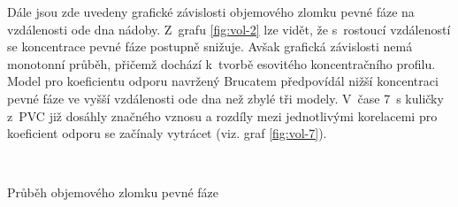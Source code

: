 Dále jsou zde uvedeny grafické závislosti objemového zlomku pevné fáze na vzdálenosti ode dna nádoby. Z~grafu \ref{fig:vol-2} lze vidět, že s~rostoucí vzdáleností se koncentrace pevné fáze postupně snižuje. Avšak grafická závislosti nemá monotonní průběh, přičemž dochází k~tvorbě esovitého koncentračního profilu. Model pro koeficientu odporu navržený Brucatem předpovídál nižší koncentraci pevné fáze ve vyšší vzdálenosti ode dna než zbylé tři modely. V~čase \SI{7}{\second} kuličky z~PVC již dosáhly značného vznosu a rozdíly mezi jednotlivými korelacemi pro koeficient odporu se začínaly vytrácet (viz. graf \ref{fig:vol-7}).
\begin{grf}[h!]
 \centering
  \\ 
  \caption{Průběh objemového zlomku pevné fáze}
  \label{fig:vol}
\end{grf}
\newpage

